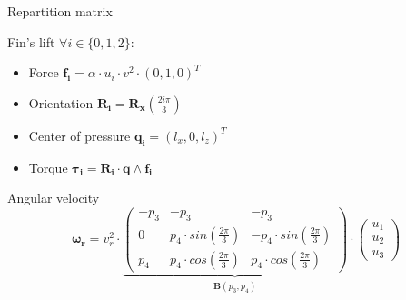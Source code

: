 \documentclass[10pt, xcolor={usenames, dvipsnames}]{beamer}
\begin{document}
    \begin{frame}{Repartition matrix}
        \centering
        \begin{minipage}{0.8\textwidth}
            \begin{block}{Fin's lift}
                $\forall i \in \{0, 1, 2\}:$
                \begin{itemize}
                    \item Force $\mathbf{f_i} = \alpha \cdot u_i \cdot v^2 \cdot (0, 1, 0)^T$
                    \item Orientation $\mathbf{R_i} = \mathbf{R_x}\left(\frac{2i\pi}{3}\right)$
                    \item Center of pressure $\mathbf{q_i} = (\mathit{l_x}, 0, \mathit{l_z})^T$
                    \item Torque $\mathbf{\tau_i} = \mathbf{R_i} \cdot \mathbf{q} \wedge \mathbf{f_i}$
                \end{itemize}
            \end{block}
            \begin{block}{Angular velocity}
                \begin{equation}
                    \mathbf{\omega_r} = v_r^2 \cdot 
                        \underbrace{
                            \left(
                            \begin{smallmatrix}
                                -p_3 & -p_3 & -p_3 \\
                                0 & p_4 \cdot sin(\frac{2\pi}{3}) & -p_4 \cdot sin(\frac{2\pi}{3}) \\
                                p_4 & p_4 \cdot cos(\frac{2\pi}{3}) & p_4 \cdot cos(\frac{2\pi}{3})
                            \end{smallmatrix}
                            \right)
                        }_{\mathbf{B}(p_3, p_4)} \cdot \left(\begin{smallmatrix}u_1\\ u_2\\ u_3\end{smallmatrix}\right)
                \end{equation}
            \end{block}
        \end{minipage}
    \end{frame}
    
\end{document}
